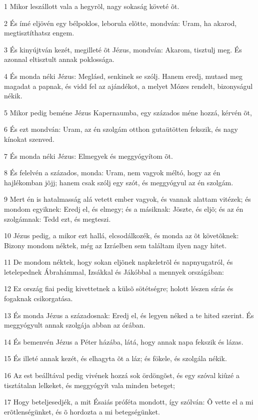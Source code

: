 \par 1 Mikor leszállott vala a hegyrõl, nagy sokaság követé õt.
\par 2 És ímé eljövén egy bélpoklos, leborula elõtte, mondván: Uram, ha akarod, megtisztíthatsz engem.
\par 3 És kinyújtván kezét, megilleté õt Jézus, mondván: Akarom, tisztulj meg. És azonnal eltisztult annak poklossága.
\par 4 És monda néki Jézus: Meglásd, senkinek se szólj. Hanem eredj,  mutasd meg magadat a papnak, és vidd fel az ajándékot, a melyet Mózes rendelt, bizonyságul nékik.
\par 5 Mikor pedig beméne Jézus Kapernaumba, egy százados méne hozzá, kérvén õt,
\par 6 És ezt mondván: Uram, az én szolgám otthon gutaütötten fekszik, és nagy kínokat szenved.
\par 7 És monda néki Jézus: Elmegyek és meggyógyítom õt.
\par 8 És felelvén a százados, monda: Uram, nem vagyok méltó, hogy az én hajlékomban jõjj; hanem csak szólj egy szót, és meggyógyul az én szolgám.
\par 9 Mert én is hatalmasság alá vetett ember vagyok, és vannak alattam vitézek; és mondom egyiknek: Eredj el, és elmegy; és a másiknak: Jöszte, és eljõ; és az én szolgámnak: Tedd ezt, és megteszi.
\par 10 Jézus pedig, a mikor ezt hallá, elcsodálkozék, és monda az õt követõknek: Bizony mondom néktek, még az Izráelben sem találtam ilyen nagy hitet.
\par 11 De mondom néktek, hogy sokan eljõnek napkeletrõl és napnyugatról, és letelepednek  Ábrahámmal, Izsákkal és Jákóbbal a mennyek országában:
\par 12 Ez ország fiai pedig kivettetnek a külsõ sötétségre; holott lészen sírás és fogaknak csikorgatása.
\par 13 És monda Jézus a századosnak: Eredj el, és legyen néked a te hited szerint. És meggyógyult annak szolgája abban az órában.
\par 14 És bemenvén Jézus a Péter házába, látá, hogy annak napa fekszik és lázas.
\par 15 És illeté annak kezét, és elhagyta õt a láz; és fökele, és szolgála nékik.
\par 16 Az est beálltával pedig vivének hozzá sok ördöngõst, és egy szóval kiûzé a tisztátalan lelkeket, és meggyógyít vala minden beteget;
\par 17 Hogy beteljesedjék, a mit Ésaiás próféta mondott, így szólván: Õ vette el a mi erõtlenségünket, és õ hordozta a mi betegségünket.
